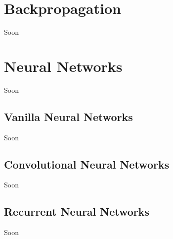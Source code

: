 \vspace{-0.3cm}





\section{Backpropagation}\label{sec:3.7}
\vspace{-0.5cm}
\noindent Soon

\vspace{-0.3cm}




\section{Neural Networks}\label{sec:3.8}
\vspace{-0.5cm}
\noindent Soon

\vspace{-0.3cm}


\subsection{Vanilla Neural Networks}\label{sec:3.8.1}
\vspace{-0.5cm}
\noindent Soon


\vspace{-0.3cm}


\subsection{Convolutional Neural Networks}\label{sec:3.8.2}
\vspace{-0.5cm}
\noindent Soon


\vspace{-0.3cm}


\subsection{Recurrent Neural Networks}\label{sec:3.8.3}
\vspace{-0.5cm}
\noindent Soon



